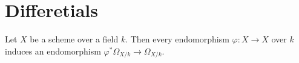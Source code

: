 \section{Differetials}


\begin{proposition}\label{prop:endomorphism_induces_endomorphism_on_geometric_cotangent_bundle}
    Let \(X\) be a scheme over a field \(k\).
    Then every endomorphism \(\varphi:X\to X\) over \(k\) induces an endomorphism \(\varphi^*\Omega_{X/k}\to \Omega_{X/k}\).
    
\end{proposition}
